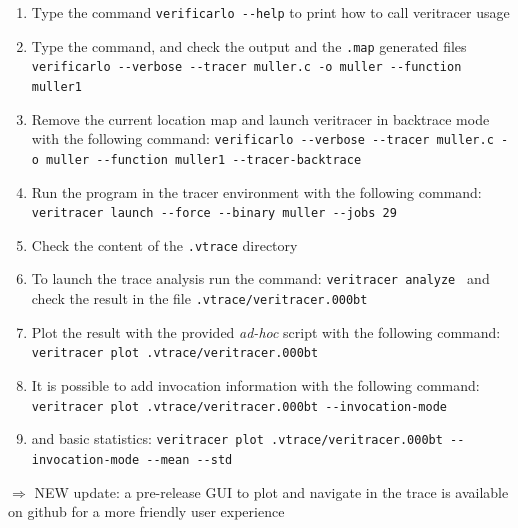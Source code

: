 \documentclass{TP}
\begin{document}
\begin{question}
    \begin{enumerate}
        \item Type the command {\tt verificarlo -{}-help} to print how to call veritracer usage
        \item Type the command, and check the output and the {\tt .map} generated files \newline
        {\tt verificarlo -{}-verbose -{}-tracer muller.c -o muller -{}-function muller1 }
        \item Remove the current location map and launch veritracer in backtrace mode with the following command: {\tt verificarlo -{}-verbose -{}-tracer muller.c -o muller -{}-function muller1  -{}-tracer-backtrace}
        \item Run the program in the tracer environment with the following command: \newline
        {\tt veritracer launch -{}-force -{}-binary muller -{}-jobs 29}
        \item Check the content of the {\tt .vtrace} directory
        \item To launch the trace analysis run the command: {\tt veritracer analyze } and check the result in  the file {\tt .vtrace/veritracer.000bt}
        \item Plot the result with the provided {\it ad-hoc} script with the following command: \newline
        {\tt veritracer plot .vtrace/veritracer.000bt}
        \item It is possible to add invocation information with the following command: \newline
        {\tt veritracer plot .vtrace/veritracer.000bt -{}-invocation-mode}
        \item and basic statistics: {\tt veritracer plot .vtrace/veritracer.000bt -{}-invocation-mode -{}-mean -{}-std}





    \end{enumerate}
    $\Rightarrow$ NEW update: a pre-release GUI to plot and navigate in the trace is available on github for a more friendly user experience
\end{question}
\end{document}
